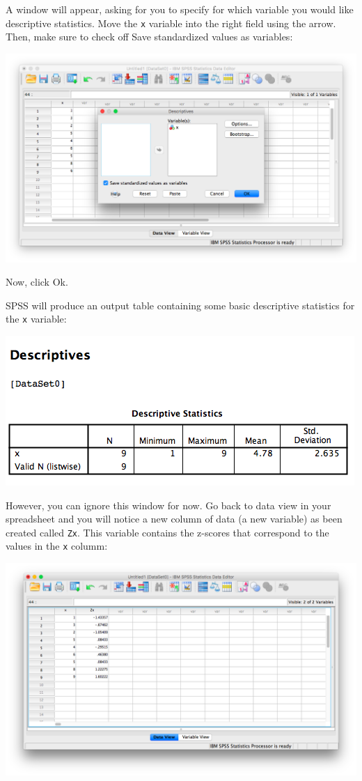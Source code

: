 \documentclass[
]{book}
\begin{document}
A window will appear, asking for you to specify for which variable you would like descriptive statistics. Move the \texttt{x} variable into the right field using the arrow. Then, make sure to check off {Save standardized values as variables}:

\includegraphics{img/4.4.13.png}

Now, click {Ok}.

SPSS will produce an output table containing some basic descriptive statistics for the \texttt{x} variable:

\includegraphics{img/4.4.14.png}

However, you can ignore this window for now. Go back to data view in your spreadsheet and you will notice a new column of data (a new variable) as been created called \texttt{Zx}. This variable contains the z-scores that correspond to the values in the \texttt{x} columm:

\includegraphics{img/4.4.15.png}
\end{document}
